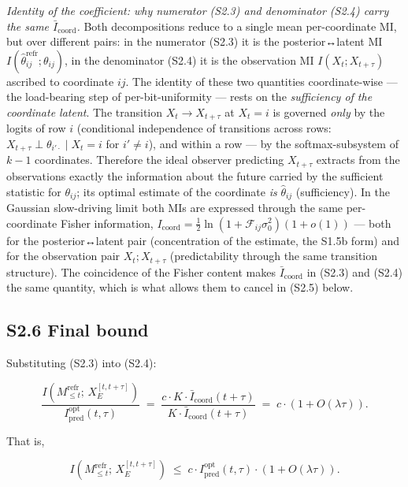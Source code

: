 \documentclass[pdflatex,sn-mathphys-ay]{sn-jnl}
\begin{document}
\emph{Identity of the coefficient: why numerator (S2.3) and denominator (S2.4) carry the same \(\bar I_{\text{coord}}\).} Both decompositions reduce to a single mean per-coordinate MI, but over different pairs: in the numerator (S2.3) it is the posterior↔latent MI \(I(\hat\theta_{ij}^{\text{refr}};\theta_{ij})\), in the denominator (S2.4) it is the observation MI \(I(X_t;X_{t+\tau})\) ascribed to coordinate \(ij\). The identity of these two quantities coordinate-wise --- the load-bearing step of per-bit-uniformity --- rests on the \emph{sufficiency of the coordinate latent}. The transition \(X_t \to X_{t+\tau}\) at \(X_t = i\) is governed \emph{only} by the logits of row \(i\) (conditional independence of transitions across rows: \(X_{t+\tau} \perp \theta_{i'\cdot} \mid X_t = i\) for \(i' \ne i\)), and within a row --- by the softmax-subsystem of \(k-1\) coordinates. Therefore the ideal observer predicting \(X_{t+\tau}\) extracts from the observations exactly the information about the future carried by the sufficient statistic for \(\theta_{ij}\); its optimal estimate of the coordinate \emph{is} \(\hat\theta_{ij}\) (sufficiency). In the Gaussian slow-driving limit both MIs are expressed through the same per-coordinate Fisher information, \(I_{\text{coord}} = \tfrac12\ln(1 + \mathcal{F}_{ij}\sigma_0^2)(1+o(1))\) --- both for the posterior↔latent pair (concentration of the estimate, the S1.5b form) and for the observation pair \(X_t;X_{t+\tau}\) (predictability through the same transition structure). The coincidence of the Fisher content makes \(\bar I_{\text{coord}}\) in (S2.3) and (S2.4) the same quantity, which is what allows them to cancel in (S2.5) below.



\subsection*{S2.6 Final bound}\label{s2.6-final-bound}



Substituting (S2.3) into (S2.4):



\[\frac{I(M_{\le t}^{\text{refr}};\, X_E^{[t, t+\tau]})}{I_{\text{pred}}^{\text{opt}}(t, \tau)} \;=\; \frac{c \cdot K \cdot \bar I_{\text{coord}}(t+\tau)}{K \cdot \bar I_{\text{coord}}(t+\tau)} \;=\; c \cdot (1 + O(\lambda \tau)).\]



That is,



\begin{equation}I(M_{\le t}^{\text{refr}};\, X_E^{[t, t+\tau]}) \;\le\; c \cdot I_{\text{pred}}^{\text{opt}}(t, \tau) \cdot (1 + O(\lambda \tau)). \tag{S2.5}\end{equation}
\end{document}

